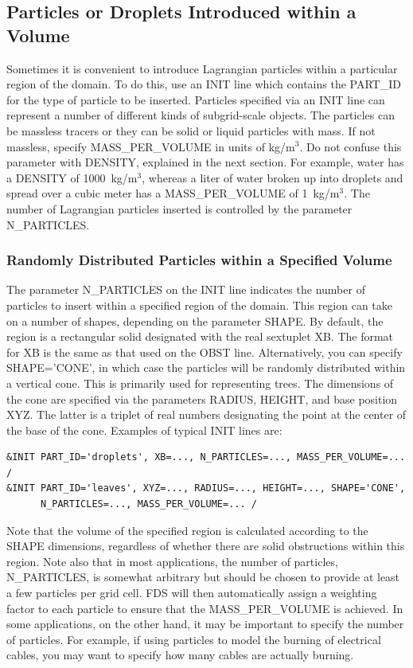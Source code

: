 \documentclass[11pt]{book}
\begin{document}
\subsection{Particles or Droplets Introduced within a Volume}
\label{info:initial_droplets}

Sometimes it is convenient to introduce Lagrangian particles within a particular region of the domain. To do this, use an {\ct INIT} line which contains the {\ct PART\_ID} for the type of particle to be inserted. Particles specified via an {\ct INIT} line can represent a number of different kinds of subgrid-scale objects. The particles can be massless tracers or they can be solid or liquid particles with mass. If not massless, specify {\ct MASS\_PER\_VOLUME} in units of kg/m$^3$. Do not confuse this parameter with {\ct DENSITY}, explained in the next section. For example, water has a {\ct DENSITY} of 1000~kg/m$^3$, whereas a liter of water broken up into droplets and spread over a cubic meter has a {\ct MASS\_PER\_VOLUME} of 1~kg/m$^3$. The number of Lagrangian particles inserted is controlled by the parameter {\ct N\_PARTICLES}.

\subsubsection{Randomly Distributed Particles within a Specified Volume}

The parameter {\ct N\_PARTICLES} on the {\ct INIT} line indicates the number of particles to insert within a specified region of the domain. This region can take on a number of shapes, depending on the parameter {\ct SHAPE}. By default, the region is a rectangular solid designated with the real sextuplet {\ct XB}. The format for {\ct XB} is the same as that used on the {\ct OBST} line. Alternatively, you can specify {\ct SHAPE='CONE'}, in which case the particles will be randomly distributed within a vertical cone. This is primarily used for representing trees. The dimensions of the cone are specified via the parameters {\ct RADIUS}, {\ct HEIGHT}, and base position {\ct XYZ}. The latter is a triplet of real numbers designating the point at the center of the base of the cone. Examples of typical {\ct INIT} lines are:
\begin{lstlisting}
&INIT PART_ID='droplets', XB=..., N_PARTICLES=..., MASS_PER_VOLUME=... /
&INIT PART_ID='leaves', XYZ=..., RADIUS=..., HEIGHT=..., SHAPE='CONE',
      N_PARTICLES=..., MASS_PER_VOLUME=... /
\end{lstlisting}
Note that the volume of the specified region is calculated according to the {\ct SHAPE} dimensions, regardless of whether there are solid obstructions within this region. Note also that in most applications, the number of particles, {\ct N\_PARTICLES}, is somewhat arbitrary but should be chosen to provide at least a few particles per grid cell. FDS will then automatically assign a weighting factor to each particle to ensure that the {\ct MASS\_PER\_VOLUME} is achieved. In some applications, on the other hand, it may be important to specify the number of particles. For example, if using particles to model the burning of electrical cables, you may want to specify how many cables are actually burning.
\end{document}
